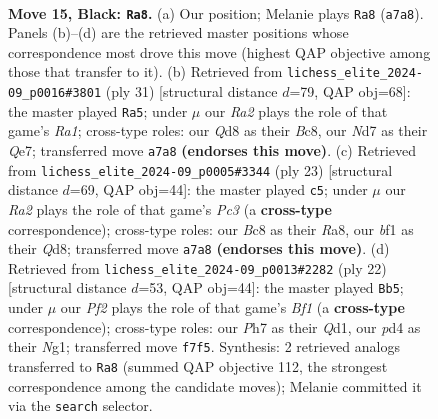 \documentclass[11pt]{article}
\begin{document}
\clearpage

\begin{figure}[p]\centering
\begin{subfigure}{0.46\textwidth}\centering
\resizebox{\linewidth}{!}{%
\newchessgame
\chessboard[
  setfen={2bq1rk1/rp1n1ppp/n1p1p3/p2pP3/3P1P2/2N2N2/PPPQ1KPP/2R2B1R b - - 5 15},
  showmover=false,
  pgfstyle=straightmove, color=movearrow, markmove={a7-a8}
]}
\caption{}
\end{subfigure}\hfill
\begin{subfigure}{0.46\textwidth}\centering
\resizebox{\linewidth}{!}{%
\newchessgame
\chessboard[
  setfen={r1b2rk1/1p1nqpp1/2n1p2p/2P5/p2pN3/3P1NP1/PPQ2PBP/2R1R1K1 b - - 4 16},
  showmover=false,
  pgfstyle=straightmove, color=movearrow, markmove={a8-a5}
]}
\caption{}
\end{subfigure}
\\[4pt]
\begin{subfigure}{0.46\textwidth}\centering
\resizebox{\linewidth}{!}{%
\newchessgame
\chessboard[
  setfen={r2q1rk1/p3ppbp/1pp2np1/8/1n1PP3/2N2N1P/PP2QPP1/R1B2RK1 b - - 0 12},
  showmover=false,
  pgfstyle=straightmove, color=movearrow, markmove={c6-c5}
]}
\caption{}
\end{subfigure}\hfill
\begin{subfigure}{0.46\textwidth}\centering
\resizebox{\linewidth}{!}{%
\newchessgame
\chessboard[
  setfen={r1bq1rk1/ppp2pp1/2n2n1p/3p4/3Pp3/2P1P2P/PP1N1PP1/R2QKBNR w KQ - 0 12},
  showmover=false,
  pgfstyle=straightmove, color=movearrow, markmove={f1-b5}
]}
\caption{}
\end{subfigure}
\caption{\textbf{Move 15, Black: \texttt{Ra8}.} (a) Our position; Melanie plays \texttt{Ra8} (\texttt{a7a8}). Panels (b)--(d) are the retrieved master positions whose correspondence most drove this move (highest QAP objective among those that transfer to it). (b) Retrieved from \texttt{lichess\_elite\_2024-09\_p0016\#3801} (ply 31) [structural distance $d$=79, QAP obj=68]: the master played \texttt{Ra5}; under $\mu$ our \emph{Ra2} plays the role of that game's \emph{Ra1}; cross-type roles: our \emph{Q}d8 as their \emph{B}c8, our \emph{N}d7 as their \emph{Q}e7; transferred move \texttt{a7a8} \textbf{(endorses this move)}. (c) Retrieved from \texttt{lichess\_elite\_2024-09\_p0005\#3344} (ply 23) [structural distance $d$=69, QAP obj=44]: the master played \texttt{c5}; under $\mu$ our \emph{Ra2} plays the role of that game's \emph{Pc3} (a \textbf{cross-type} correspondence); cross-type roles: our \emph{B}c8 as their \emph{R}a8, our \emph{b}f1 as their \emph{Q}d8; transferred move \texttt{a7a8} \textbf{(endorses this move)}. (d) Retrieved from \texttt{lichess\_elite\_2024-09\_p0013\#2282} (ply 22) [structural distance $d$=53, QAP obj=44]: the master played \texttt{Bb5}; under $\mu$ our \emph{Pf2} plays the role of that game's \emph{Bf1} (a \textbf{cross-type} correspondence); cross-type roles: our \emph{P}h7 as their \emph{Q}d1, our \emph{p}d4 as their \emph{N}g1; transferred move \texttt{f7f5}. Synthesis: 2 retrieved analogs transferred to \texttt{Ra8} (summed QAP objective 112, the strongest correspondence among the candidate moves); Melanie committed it via the \texttt{search} selector.}
\label{fig:thought-m29}
\end{figure}
\end{document}
